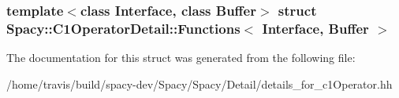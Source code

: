 \subsubsection*{template$<$class \-Interface, class \-Buffer$>$ struct Spacy\-::\-C1\-Operator\-Detail\-::\-Functions$<$ Interface, Buffer $>$}



\-The documentation for this struct was generated from the following file\-:\begin{DoxyCompactItemize}
\item 
/home/travis/build/spacy-\/dev/\-Spacy/\-Spacy/\-Detail/details\-\_\-for\-\_\-c1\-Operator.\-hh\end{DoxyCompactItemize}
